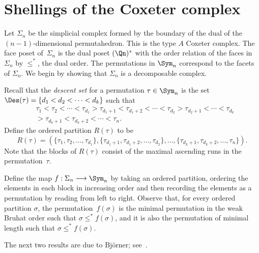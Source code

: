 \section{Shellings of the Coxeter complex}
\label{section_shellings_of_Coxeter_complex}


Let $\Sigma_{n}$ be the simplicial complex formed by
the boundary of the dual of the $(n-1)$-dimensional permutahedron.
This is the type $A$ Coxeter complex.
The face poset of~$\Sigma_{n}$ is the dual poset $(\Qn)^{*}$
with the order relation of the faces in $\Sigma_{n}$ by $\leq^{*}$,
the dual order.
The permutations in $\Sym_{n}$ correspond to
the facets of $\Sigma_{n}$.
We begin by showing that $\Sigma_{n}$ is a decomposable complex.

Recall that the \emph{descent set} 
for a permutation $\tau \in \Sym_{n}$
is the set $\Des(\tau) = \{d_{1} < d_{2} < \cdots < d_{k}\}$
such that
\begin{align*}
& \tau_{1} < \tau_{2} < \cdots < \tau_{d_{1}}
>
\tau_{d_{1}+1} < \tau_{d_{1}+2} < \cdots < \tau_{d_{2}}
>
\tau_{d_{2}+1}
< 
\cdots 
<
\tau_{d_{k}} \\
& >
\tau_{d_{k}+1} < \tau_{d_{k}+2} < \cdots < \tau_{n} .
\end{align*}
Define the ordered partition $R(\tau)$ to be
$$
R(\tau)
= 
(\{\tau_{1}, \tau_{2}, \ldots, \tau_{d_{1}}\},
\{\tau_{d_{1}+1}, \tau_{d_{1}+2}, \ldots, \tau_{d_{2}}\},
\ldots,
\{\tau_{d_{k}+1}, \tau_{d_{k}+2}, \ldots, \tau_{n}\}) . 
$$
Note that the blocks of $R(\tau)$ consist of the maximal ascending runs
in the permutation~$\tau$.

Define the map $f : \Sigma_{n} \longrightarrow \Sym_{n}$
by taking an ordered partition,
ordering the elements in each block in increasing order and then
recording the elements as a permutation by reading from left to right.
Observe that, for every ordered partition $\sigma$, the permutation~$f(\sigma)$
is the minimal permutation in the weak Bruhat order
such that $\sigma\leq^* f(\sigma)$, and it is also the permutation of
minimal length such that $\sigma\leq^* f(\sigma)$.

The next two results are due to Bj\"orner;
see~\cite[Theorem~2.1]{Bjorner_II}.


